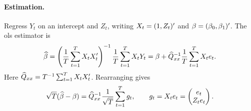 \documentclass[a4paper,12pt]{article}
\begin{document}
\paragraph{Estimation.}
Regress $Y_t$ on an intercept and $Z_t$, writing
$X_t=(1,Z_t)^{\prime}$ and $\beta=(\beta_0,\beta_1)^{\prime}$.
The \gls{ols} estimator is
\begin{align}
	\widehat\beta
	=\left(\frac1T\sum_{t=1}^T X_tX_t^{\prime}\right)^{-1}\frac1T\sum_{t=1}^T X_tY_t
	=\beta+\widehat Q_{xx}^{-1}\frac1T\sum_{t=1}^T X_te_t.
\end{align}
Here $\widehat Q_{xx}=T^{-1}\sum_{t=1}^T X_tX_t^{\prime}$.
Rearranging gives
\begin{align}
	\sqrt T(\widehat\beta-\beta)
	=\widehat Q_{xx}^{-1}\frac1{\sqrt T}\sum_{t=1}^T g_t,
	\qquad g_t=X_te_t=\begin{pmatrix}e_t\\Z_te_t\end{pmatrix}.
\end{align}
\end{document}
